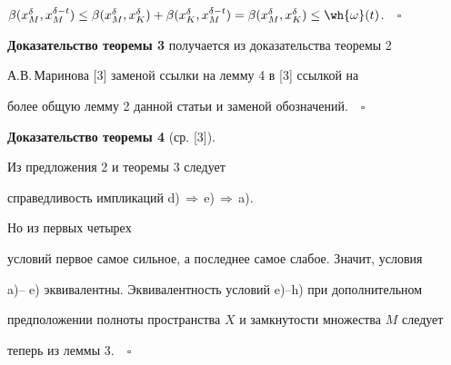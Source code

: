 $\beta (x_{M}^{\delta },x_{M}^{\delta - t})


\leq \beta (x_{M}^{\delta },x_{K}^{\delta }) +


\beta (x_{K}^{\delta },x_{M}^{\delta - t}) =


\beta (x_{M}^{\delta },x_{K}^{\delta}) \leq \wh {\omega}(t)$.$\quad\square$


\medskip





{\bf Доказательство теоремы 3} получается из доказательства теоремы 2 


А.В.\,Ма\-ри\-но\-ва [3] заменой ссылки на лемму 4 в [3] ссылкой на 


более общую лемму 2 данной статьи и заменой обозначений.$\quad\square$


\medskip





{\bf Доказательство теоремы 4} (ср. [3]).


Из предложения 2 и теоремы 3 следует


справедливость импликаций d)\,$\Rightarrow$\,e)\,$\Rightarrow$\,a).


Но из первых четырех


условий первое самое сильное, а последнее самое слабое. Значит, условия 


a)-- e) эквивалентны. Эквивалентность условий e)--h) при дополнительном 


предположении полноты пространства $X$ и замкнутости множества $M$ следует


теперь из леммы 3.$\quad\square$





